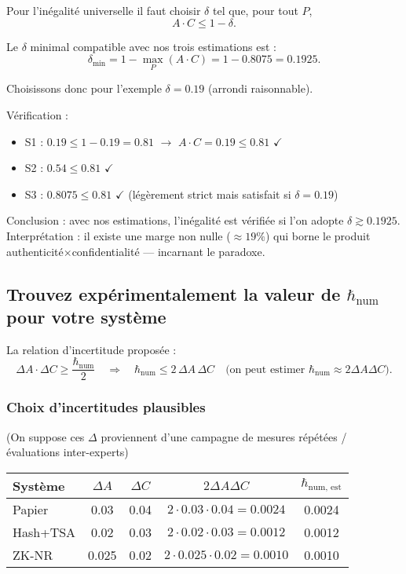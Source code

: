 \documentclass[12pt,a4paper]{article}
\begin{document}
	 Pour l'inégalité universelle il faut choisir $\delta$ tel que, pour tout $P$,
	 \[
	 A \cdot C \leq 1 - \delta.
	 \]
	 
	 Le $\delta$ minimal compatible avec nos trois estimations est :
	 \[
	 \delta_{\min} = 1 - \max_P (A \cdot C) = 1 - 0.8075 = 0.1925.
	 \]
	 
	 Choisissons donc pour l'exemple $\delta = 0.19$ (arrondi raisonnable).
	 
	 Vérification :
	 
	 \begin{itemize}
	 	\item S1 : $0.19 \leq 1 - 0.19 = 0.81$ $\rightarrow$ $A \cdot C = 0.19 \leq 0.81$ $\checkmark$
	 	\item S2 : $0.54 \leq 0.81$ $\checkmark$
	 	\item S3 : $0.8075 \leq 0.81$ $\checkmark$ (légèrement strict mais satisfait si $\delta = 0.19$)
	 \end{itemize}
	 
	 Conclusion : avec nos estimations, l'inégalité est vérifiée si l'on adopte $\delta \gtrsim 0.1925$. Interprétation : il existe une marge non nulle ($\approx 19\%$) qui borne le produit authenticité$\times$confidentialité — incarnant le paradoxe.
	 
	 \subsection{Trouvez expérimentalement la valeur de $\hbar_{\text{num}}$ pour votre système}
	 
	 La relation d'incertitude proposée :
	 \[
	 \Delta A \cdot \Delta C \geq \frac{\hbar_{\text{num}}}{2} 
	 \quad \Rightarrow \quad 
	 \hbar_{\text{num}} \leq 2 \, \Delta A \, \Delta C
	 \quad \text{(on peut estimer } \hbar_{\text{num}} \approx 2 \Delta A \Delta C \text{)}.
	 \]
	 
	 \subsubsection*{Choix d'incertitudes plausibles}
	 (On suppose ces $\Delta$ proviennent d'une campagne de mesures répétées / évaluations inter-experts)
	 
	 \begin{table}[h]
	 	\centering
	 	\begin{tabular}{lcccc}
	 		\hline
	 		\textbf{Système} & $\Delta A$ & $\Delta C$ & $2 \Delta A \Delta C$ & $\hbar_{\text{num, est}}$ \\
	 		\hline
	 		Papier & 0.03 & 0.04 & $2 \cdot 0.03 \cdot 0.04 = 0.0024$ & 0.0024 \\
	 		Hash+TSA & 0.02 & 0.03 & $2 \cdot 0.02 \cdot 0.03 = 0.0012$ & 0.0012 \\
	 		ZK-NR & 0.025 & 0.02 & $2 \cdot 0.025 \cdot 0.02 = 0.0010$ & 0.0010 \\
	 		\hline
	 	\end{tabular}
	 \end{table}
	 
\end{document}
